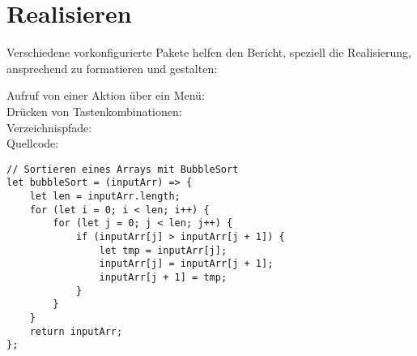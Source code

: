 \chapter{Realisieren}

Verschiedene vorkonfigurierte Pakete helfen den Bericht, speziell die Realisierung, ansprechend zu formatieren und gestalten:

Aufruf von einer Aktion über ein Menü:
 \\
Drücken von Tastenkombinationen:
 \\
Verzeichnispfade:
 \\
Quellcode:

\begin{codebox}[]
  \begin{verbatim}
// Sortieren eines Arrays mit BubbleSort
let bubbleSort = (inputArr) => {
    let len = inputArr.length;
    for (let i = 0; i < len; i++) {
        for (let j = 0; j < len; j++) {
            if (inputArr[j] > inputArr[j + 1]) {
                let tmp = inputArr[j];
                inputArr[j] = inputArr[j + 1];
                inputArr[j + 1] = tmp;
            }
        }
    }
    return inputArr;
};
  \end{verbatim}
\end{codebox}